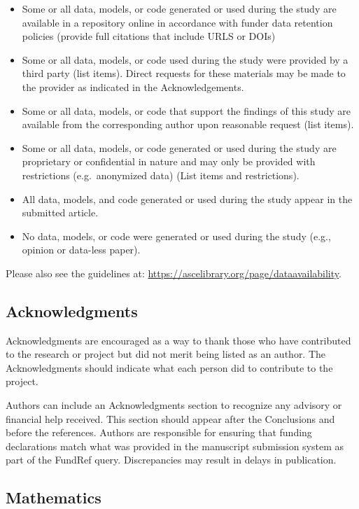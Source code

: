 \documentclass[Journal,LineNumbers]{ascelike-new}
\begin{document}
\begin{itemize}
\item
  Some or all data, models, or code generated or used during the study
  are available in a repository online in accordance with funder data
  retention policies (provide full citations that include URLS or DOIs)
\item
  Some or all data, models, or code used during the study were provided
  by a third party (list items). Direct requests for these materials may
  be made to the provider as indicated in the Acknowledgements.
\item
  Some or all data, models, or code that support the findings of this
  study are available from the corresponding author upon reasonable
  request (list items).
\item
  Some or all data, models, or code generated or used during the study
  are proprietary or confidential in nature and may only be provided
  with restrictions (e.g.~anonymized data) (List items and
  restrictions).
\item
  All data, models, and code generated or used during the study appear
  in the submitted article.
\item
  No data, models, or code were generated or used during the study
  (e.g., opinion or data-less paper).
\end{itemize}

Please also see the guidelines at:
\url{https://ascelibrary.org/page/dataavailability}.

\subsection{Acknowledgments}\label{acknowledgments}

Acknowledgments are encouraged as a way to thank those who have
contributed to the research or project but did not merit being listed as
an author. The Acknowledgments should indicate what each person did to
contribute to the project.

Authors can include an Acknowledgments section to recognize any advisory
or financial help received. This section should appear after the
Conclusions and before the references. Authors are responsible for
ensuring that funding declarations match what was provided in the
manuscript submission system as part of the FundRef query. Discrepancies
may result in delays in publication.

\subsection{Mathematics}\label{mathematics}
\end{document}
